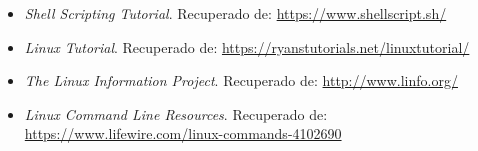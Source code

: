 \documentclass[a4paper]{article}
\begin{document}
\begin{itemize}
\item \textit{Shell Scripting Tutorial}. Recuperado de:
\url{https://www.shellscript.sh/}

\item \textit{Linux Tutorial}. Recuperado de:
\url{https://ryanstutorials.net/linuxtutorial/}

\item \textit{The Linux Information Project}. Recuperado de:
\url{http://www.linfo.org/}


\item \textit{Linux Command Line Resources}. Recuperado de:
\url{https://www.lifewire.com/linux-commands-4102690}


\end{itemize}
\end{document}
